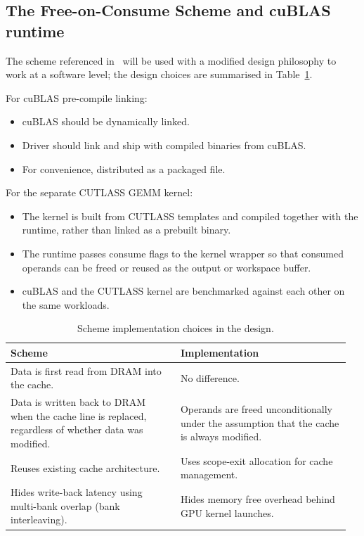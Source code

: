 \documentclass[a4paper]{article}
\begin{document}
	\subsection{The Free-on-Consume Scheme and cuBLAS runtime}
	The scheme referenced in~\cite{DybdahlKGN06} will be used with a modified design philosophy to work at a software level; the design choices are summarised in Table~\ref{tab:scheme_implementation}.

	For cuBLAS pre-compile linking:
	\begin{itemize}
		\item cuBLAS should be dynamically linked.
		\item Driver should link and ship with compiled binaries from cuBLAS.
		\item For convenience, distributed as a packaged file.
	\end{itemize}

	For the separate CUTLASS GEMM kernel:
	\begin{itemize}
		\item The kernel is built from CUTLASS templates and compiled together with the runtime, rather than linked as a prebuilt binary.
		\item The runtime passes consume flags to the kernel wrapper so that consumed operands can be freed or reused as the output or workspace buffer.
		\item cuBLAS and the CUTLASS kernel are benchmarked against each other on the same workloads.
	\end{itemize}
	
	\begin{table}[H]
  \centering
  \caption{Scheme implementation choices in the design.}
  \label{tab:scheme_implementation}
  \begin{tabular}{@{}>{\RaggedRight}p{0.48\linewidth} >{\RaggedRight}p{0.48\linewidth}@{}}
    \toprule
    \textbf{Scheme} & \textbf{Implementation} \\
    \midrule
    Data is first read from DRAM into the cache. 
      & No difference. \\ \addlinespace
    
    Data is written back to DRAM when the cache line is replaced, regardless of whether data was modified. 
      & Operands are freed unconditionally under the assumption that the cache is always modified. \\ \addlinespace
    
    Reuses existing cache architecture. 
      & Uses scope-exit allocation for cache management. \\ \addlinespace
    
    Hides write-back latency using multi-bank overlap (bank interleaving). 
      & Hides memory free overhead behind GPU kernel launches. \\
    \bottomrule
  \end{tabular}
\end{table}
\end{document}

